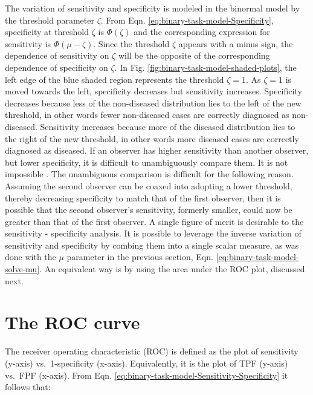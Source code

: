 \documentclass[
]{book}
\begin{document}
The variation of sensitivity and specificity is modeled in the binormal model by the threshold parameter \(\zeta\). From Eqn. \eqref{eq:binary-task-model-Specificity}, specificity at threshold \(\zeta\) is \(\Phi(\zeta)\) and the corresponding expression for sensitivity is \(\Phi(\mu-\zeta)\). Since the threshold \(\zeta\) appears with a minus sign, the dependence of sensitivity on \(\zeta\) will be the opposite of the corresponding dependence of specificity on \(\zeta\). In Fig. \ref{fig:binary-task-model-shaded-plots}, the left edge of the blue shaded region represents the threshold \(\zeta = 1\). As \(\zeta = 1\) is moved towards the left, specificity decreases but sensitivity increases. Specificity decreases because less of the non-diseased distribution lies to the left of the new threshold, in other words fewer non-diseased cases are correctly diagnosed as non-diseased. Sensitivity increases because more of the diseased distribution lies to the right of the new threshold, in other words more diseased cases are correctly diagnosed as diseased. If an observer has higher sensitivity than another observer, but lower specificity, it is difficult to unambiguously compare them. It is not impossible \citep{RN2637}. The unambiguous comparison is difficult for the following reason. Assuming the second observer can be coaxed into adopting a lower threshold, thereby decreasing specificity to match that of the first observer, then it is possible that the second observer's sensitivity, formerly smaller, could now be greater than that of the first observer. A single figure of merit is desirable to the sensitivity - specificity analysis. It is possible to leverage the inverse variation of sensitivity and specificity by combing them into a single scalar measure, as was done with the \(\mu\) parameter in the previous section, Eqn. \eqref{eq:binary-task-model-solve-mu}. An equivalent way is by using the area under the ROC plot, discussed next.

\hypertarget{binary-task-model-roc-curve}{%
\section{The ROC curve}\label{binary-task-model-roc-curve}}

The receiver operating characteristic (ROC) is defined as the plot of sensitivity (y-axis) vs.~1-specificity (x-axis). Equivalently, it is the plot of TPF (y-axis) vs.~FPF (x-axis). From Eqn. \eqref{eq:binary-task-model-Sensitivity-Specificity} it follows that:
\end{document}
